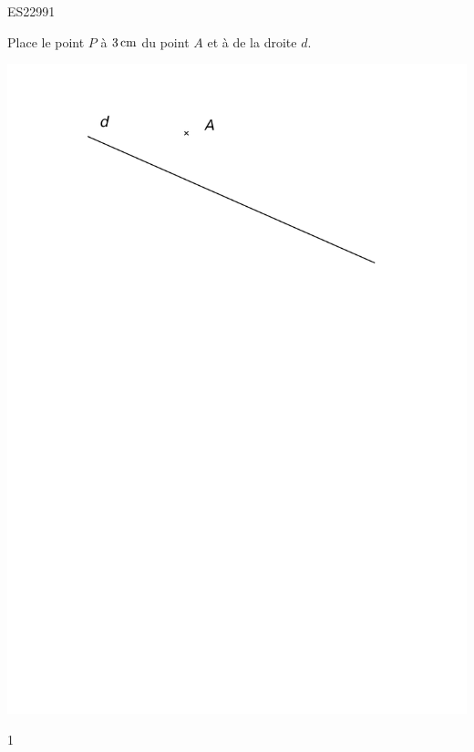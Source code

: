 \documentclass[a4paper,11pt]{report}
\begin{document}
\begin{exol}{ES22}{99}{1}
\end{exol}

\begin{exop}
{
	Place le point $P$ à $\tunit{3}{cm}$ du point $A$ et à  de la droite $d$.

\begin{center}	
\includegraphics[scale=0.8]{media/es-10/12-3}
\end{center}
\vspace{-0.7cm}
}
{1}
\end{exop}
\end{document}
